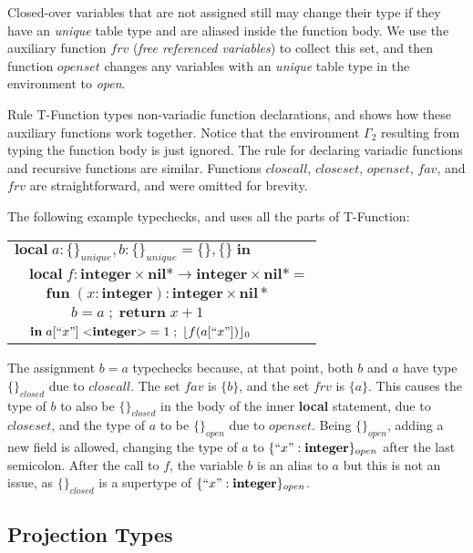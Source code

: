 \documentclass[10pt]{sigplanconf}
\newcommand{\Nil}{\mathbf{nil}}
\newcommand{\Integer}{\mathbf{integer}}
\newcommand{\Void}{\Nil{*}}
\newcommand{\env}{\Gamma}
\begin{document}
Closed-over variables that are not assigned still may
change their type if they have an {\em unique} table type
and are aliased inside the function body. We use the auxiliary
function $frv$ ({\em free referenced variables}) to collect
this set, and then function $openset$ changes any variables
with an {\em unique} table type in the environment to {\em open}.

Rule {\sc T-Function} types non-variadic function declarations,
and shows how these auxiliary functions work together.
Notice that the environment $\env_{2}$ resulting from
typing the function body is just ignored. The rule for
declaring variadic functions and recursive functions are
similar. Functions $closeall$, $closeset$, $openset$, $fav$,
and $frv$ are straightforward, and were omitted for brevity.

The following example typechecks, and uses all the parts of {\sc T-Function}:
{\footnotesize
\begin{center}
\begin{tabular}{llll}
\multicolumn{4}{l}{$\mathbf{local} \; a:\{\}_{unique}, b:\{\}_{unique} = \{\}, \{\} \; \mathbf{in}$}\\
& \multicolumn{3}{l}{$\mathbf{local} \; f:\Integer \times \Void \rightarrow \Integer \times \Void =$}\\
& & \multicolumn{2}{l}{$\mathbf{fun} \; (x:\Integer):\Integer \times \Void$}\\
& & & \multicolumn{1}{l}{$b = a \;;\; \mathbf{return} \; x + 1$}\\
& \multicolumn{3}{l}{$\mathbf{in} \; a[``x"] \; {<}\Integer{>} = 1 \;;\; \lfloor f(a[``x"]) \rfloor_0$}\\
\end{tabular}
\end{center}
}

The assignment $b=a$ typechecks because, at that point, 
both $b$ and $a$ have type $\{\}_{closed}$ due to $closeall$.
The set $fav$ is $\{b\}$, and the set $frv$ is $\{a\}$.
This causes the type of $b$ to also be $\{\}_{closed}$
in the body of the inner {\bf local} statement, due to $closeset$, and the type of $a$ to be $\{\}_{open}$ due
to $openset$. Being $\{\}_{open}$, adding a new field
is allowed, changing the type of $a$ to $\{``x": \Integer\}_{open}$ after the last semicolon. After the call to
$f$, the variable $b$ is an alias to $a$ but this is not
an issue, as $\{\}_{closed}$ is a supertype of $\{``x": \Integer\}_{open}$.

\subsection{Projection Types}
\label{sec:projections}
\end{document}
